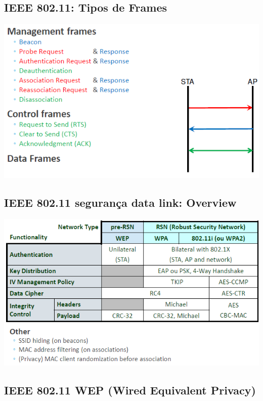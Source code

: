 \documentclass{article}
\begin{document}
\subsection{IEEE 802.11: Tipos de Frames}

\begin{center}
  \includegraphics[scale=0.6]{43}
\end{center}

\subsection{IEEE 802.11 segurança data link: Overview}

\begin{center}
  \includegraphics[scale=0.6]{44}
\end{center}

\pagebreak

\subsection{IEEE 802.11 WEP (Wired Equivalent Privacy)}
\end{document}
